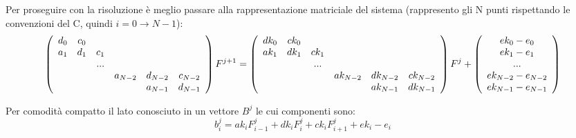 Per proseguire con la risoluzione \`e meglio passare alla rappresentazione matriciale del sistema (rappresento gli N punti rispettando le convenzioni del C, quindi $i=0\to N-1$):
\begin{equation}
\left( \begin{array}{cccccc}
d_0&c_0&&&\\
a_1&d_1&c_1&\\
&&...&&&\\
&&&a_{N-2}&d_{N-2}&c_{N-2}\\
&&&&a_{N-1}&d_{N-1}\\
\end{array} \right) F^{j+1} = 
\left( \begin{array}{cccccc}
dk_0&ck_0&&&&\\
ak_1&dk_1&ck_1&&&\\
&&...&&&\\
&&&ak_{N-2}&dk_{N-2}&ck_{N-2}\\
&&&&ak_{N-1}&dk_{N-1}\\
\end{array} \right) F^{j} + 
\left( \begin{array}{c}
ek_0 - e_0\\
ek_1 - e_1\\
...\\
ek_{N-2} - e_{N-2}\\
ek_{N-1} - e_{N-1}\\
\end{array} \right)
\end{equation}

Per comodit\`a compatto il lato conosciuto in un vettore $B^j$ le cui componenti sono:
\begin{equation}\label{eq:bi}
b_i^j = ak_i F_{i-1}^{j}+ dk_i F_{i}^{j} + ck_i F_{i+1}^{j} + ek_i-e_i
\end{equation}

